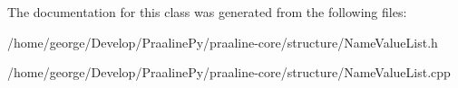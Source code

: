 The documentation for this class was generated from the following files\+:\begin{DoxyCompactItemize}
\item 
/home/george/\+Develop/\+Praaline\+Py/praaline-\/core/structure/Name\+Value\+List.\+h\item 
/home/george/\+Develop/\+Praaline\+Py/praaline-\/core/structure/Name\+Value\+List.\+cpp\end{DoxyCompactItemize}
